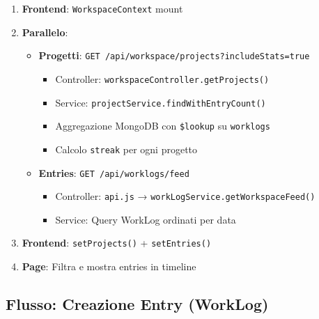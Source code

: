 \documentclass[11pt,a4paper]{article}
\begin{document}
\begin{enumerate}
    \item \textbf{Frontend}: \texttt{WorkspaceContext} mount
    \item \textbf{Parallelo}:
    \begin{itemize}
        \item \textbf{Progetti}: \texttt{GET /api/workspace/projects?includeStats=true}
        \begin{itemize}
            \item Controller: \texttt{workspaceController.getProjects()}
            \item Service: \texttt{projectService.findWithEntryCount()}
            \item Aggregazione MongoDB con \texttt{\$lookup} su \texttt{worklogs}
            \item Calcolo \texttt{streak} per ogni progetto
        \end{itemize}
        \item \textbf{Entries}: \texttt{GET /api/worklogs/feed}
        \begin{itemize}
            \item Controller: \texttt{api.js} → \texttt{workLogService.getWorkspaceFeed()}
            \item Service: Query WorkLog ordinati per data
        \end{itemize}
    \end{itemize}
    \item \textbf{Frontend}: \texttt{setProjects()} + \texttt{setEntries()}
    \item \textbf{Page}: Filtra e mostra entries in timeline
\end{enumerate}

\subsection{Flusso: Creazione Entry (WorkLog)}
\end{document}
